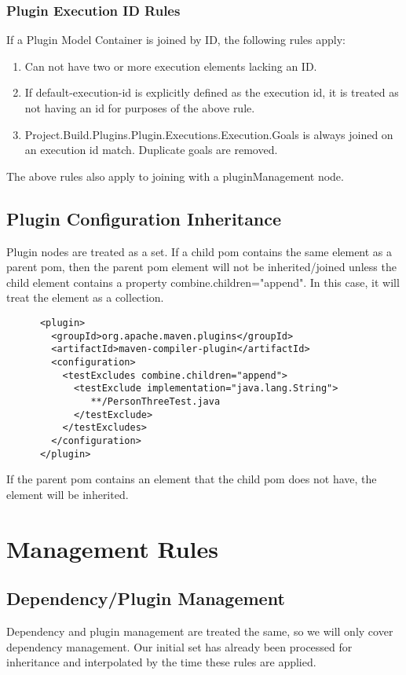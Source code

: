 \documentclass[12pt]{amsart}
\begin{document}
\subsubsection{Plugin Execution ID Rules}
If a Plugin Model Container is joined by ID, the following rules apply:

\begin{enumerate}
\item Can not have two or more execution elements lacking an ID.
\item If default-execution-id is explicitly defined as the execution id, it is treated as not having an id for purposes of the above rule.
\item Project.Build.Plugins.Plugin.Executions.Execution.Goals is always joined on an execution id match. Duplicate goals are removed.
\end{enumerate}

The above rules also apply to joining with a pluginManagement node.

\subsection{Plugin Configuration Inheritance}
Plugin nodes are treated as a set. If a child pom contains the same element as a parent pom, then the parent pom element will not be inherited/joined unless the child element contains a property combine.children="append". In this case, it will treat the element as a collection.

\begin{verbatim}
      <plugin>
        <groupId>org.apache.maven.plugins</groupId>
        <artifactId>maven-compiler-plugin</artifactId>
        <configuration>
          <testExcludes combine.children="append">
            <testExclude implementation="java.lang.String">
               **/PersonThreeTest.java
            </testExclude>
          </testExcludes>
        </configuration>
      </plugin>
\end{verbatim}

If the parent pom contains an element that the child pom does not have, the element will be inherited.



\section{Management Rules}
\subsection{Dependency/Plugin Management}
Dependency and plugin management are treated the same, so we will only cover dependency management. Our initial set has already been processed for inheritance and interpolated by the time these rules are applied. 
\end{document}

